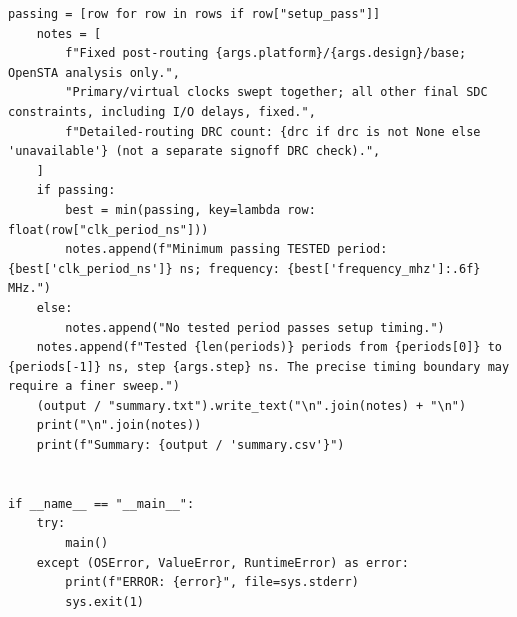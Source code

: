 \documentclass[UTF8,a4paper,11pt,fontset=fandol]{ctexart}
\begin{document}
\begin{lstlisting}[style=script]
    passing = [row for row in rows if row["setup_pass"]]
    notes = [
        f"Fixed post-routing {args.platform}/{args.design}/base; OpenSTA analysis only.",
        "Primary/virtual clocks swept together; all other final SDC constraints, including I/O delays, fixed.",
        f"Detailed-routing DRC count: {drc if drc is not None else 'unavailable'} (not a separate signoff DRC check).",
    ]
    if passing:
        best = min(passing, key=lambda row: float(row["clk_period_ns"]))
        notes.append(f"Minimum passing TESTED period: {best['clk_period_ns']} ns; frequency: {best['frequency_mhz']:.6f} MHz.")
    else:
        notes.append("No tested period passes setup timing.")
    notes.append(f"Tested {len(periods)} periods from {periods[0]} to {periods[-1]} ns, step {args.step} ns. The precise timing boundary may require a finer sweep.")
    (output / "summary.txt").write_text("\n".join(notes) + "\n")
    print("\n".join(notes))
    print(f"Summary: {output / 'summary.csv'}")


if __name__ == "__main__":
    try:
        main()
    except (OSError, ValueError, RuntimeError) as error:
        print(f"ERROR: {error}", file=sys.stderr)
        sys.exit(1)
\end{lstlisting}
\endgroup
\end{document}
